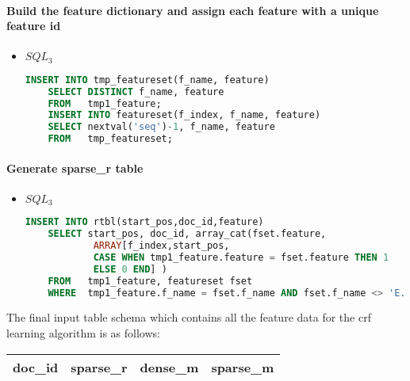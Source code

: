 \paragraph{Build the feature dictionary and assign each feature with a unique feature id}
\begin{itemize}
\item $SQL_3$\\
\begin{lstlisting}[language=SQL,gobble=4]
    INSERT INTO tmp_featureset(f_name, feature)
    SELECT DISTINCT f_name, feature
    FROM   tmp1_feature;
    INSERT INTO featureset(f_index, f_name, feature)
    SELECT nextval('seq')-1, f_name, feature
    FROM   tmp_featureset;
\end{lstlisting}
\end{itemize}

\paragraph{Generate sparse\_r table}
\begin{itemize}
\item $SQL_3$\\
\begin{lstlisting}[language=SQL,gobble=4]
    INSERT INTO rtbl(start_pos,doc_id,feature)
    SELECT start_pos, doc_id, array_cat(fset.feature,
			ARRAY[f_index,start_pos,
			CASE WHEN tmp1_feature.feature = fset.feature THEN 1
			ELSE 0 END] )
    FROM   tmp1_feature, featureset fset
    WHERE  tmp1_feature.f_name = fset.f_name AND fset.f_name <> 'E.';
\end{lstlisting}
\end{itemize}



The final input table schema which contains all the feature data for the crf learning algorithm is as follows:
\begin{center}
    \begin{tabular}{ | l | l | l | l |}
    \hline
    doc\_id & sparse\_r & dense\_m & sparse\_m \\
    \hline
    \end{tabular}
\end{center}

